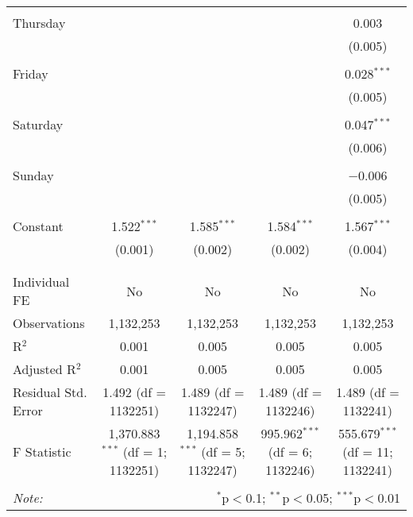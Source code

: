 \documentclass[
]{article}
\begin{document}
\begin{table}[!htbp]
{\begin{tabular}{@{\extracolsep{5pt}}lcccc}
  & & & & \\ 
 Thursday &  &  &  & 0.003 \\ 
  &  &  &  & (0.005) \\ 
  & & & & \\ 
 Friday &  &  &  & 0.028$^{***}$ \\ 
  &  &  &  & (0.005) \\ 
  & & & & \\ 
 Saturday &  &  &  & 0.047$^{***}$ \\ 
  &  &  &  & (0.006) \\ 
  & & & & \\ 
 Sunday &  &  &  & $-$0.006 \\ 
  &  &  &  & (0.005) \\ 
  & & & & \\ 
 Constant & 1.522$^{***}$ & 1.585$^{***}$ & 1.584$^{***}$ & 1.567$^{***}$ \\ 
  & (0.001) & (0.002) & (0.002) & (0.004) \\ 
  & & & & \\ 
\hline \\[-1.8ex] 
Individual FE & No & No & No & No \\ 
Observations & 1,132,253 & 1,132,253 & 1,132,253 & 1,132,253 \\ 
R$^{2}$ & 0.001 & 0.005 & 0.005 & 0.005 \\ 
Adjusted R$^{2}$ & 0.001 & 0.005 & 0.005 & 0.005 \\ 
Residual Std. Error & 1.492 (df = 1132251) & 1.489 (df = 1132247) & 1.489 (df = 1132246) & 1.489 (df = 1132241) \\ 
F Statistic & 1,370.883$^{***}$ (df = 1; 1132251) & 1,194.858$^{***}$ (df = 5; 1132247) & 995.962$^{***}$ (df = 6; 1132246) & 555.679$^{***}$ (df = 11; 1132241) \\ 
\hline 
\hline \\[-1.8ex] 
\textit{Note:}  & \multicolumn{4}{r}{$^{*}$p$<$0.1; $^{**}$p$<$0.05; $^{***}$p$<$0.01} \\ 
\end{tabular}
} 
\end{table} 
\newpage
\end{document}
